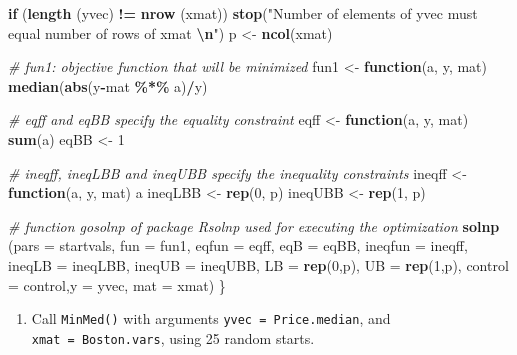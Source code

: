 \documentclass[
]{book}
\newenvironment{Shaded}{\begin{snugshade}}{\end{snugshade}}
\newcommand{\AttributeTok}[1]{\textcolor[rgb]{0.13,0.29,0.53}{#1}}
\newcommand{\CommentTok}[1]{\textcolor[rgb]{0.56,0.35,0.01}{\textit{#1}}}
\newcommand{\ControlFlowTok}[1]{\textcolor[rgb]{0.13,0.29,0.53}{\textbf{#1}}}
\newcommand{\DecValTok}[1]{\textcolor[rgb]{0.00,0.00,0.81}{#1}}
\newcommand{\FunctionTok}[1]{\textcolor[rgb]{0.13,0.29,0.53}{\textbf{#1}}}
\newcommand{\NormalTok}[1]{#1}
\newcommand{\OtherTok}[1]{\textcolor[rgb]{0.56,0.35,0.01}{#1}}
\newcommand{\SpecialCharTok}[1]{\textcolor[rgb]{0.81,0.36,0.00}{\textbf{#1}}}
\newcommand{\StringTok}[1]{\textcolor[rgb]{0.31,0.60,0.02}{#1}}
\providecommand{\tightlist}{%
  \setlength{\itemsep}{0pt}\setlength{\parskip}{0pt}}
\begin{document}
\begin{Shaded}
\begin{Highlighting}[]
  \ControlFlowTok{if}\NormalTok{ (}\FunctionTok{length}\NormalTok{ (yvec) }\SpecialCharTok{!=} \FunctionTok{nrow}\NormalTok{ (xmat)) }
    \FunctionTok{stop}\NormalTok{(}\StringTok{"Number of elements of yvec must equal number of rows of xmat }\SpecialCharTok{\textbackslash{}n}\StringTok{"}\NormalTok{)}
\NormalTok{  p }\OtherTok{\textless{}{-}} \FunctionTok{ncol}\NormalTok{(xmat)}
  
  \CommentTok{\# fun1: objective function that will be minimized}
\NormalTok{  fun1 }\OtherTok{\textless{}{-}} \ControlFlowTok{function}\NormalTok{(a, y, mat) }\FunctionTok{median}\NormalTok{(}\FunctionTok{abs}\NormalTok{(y}\SpecialCharTok{{-}}\NormalTok{mat }\SpecialCharTok{\%*\%}\NormalTok{ a)}\SpecialCharTok{/}\NormalTok{y) }

  \CommentTok{\# eqff and eqBB specify the equality constraint}
\NormalTok{  eqff }\OtherTok{\textless{}{-}} \ControlFlowTok{function}\NormalTok{(a, y, mat) }\FunctionTok{sum}\NormalTok{(a)}
\NormalTok{  eqBB }\OtherTok{\textless{}{-}} \DecValTok{1}
  
  \CommentTok{\# ineqff, ineqLBB and ineqUBB specify the inequality constraints}
\NormalTok{  ineqff }\OtherTok{\textless{}{-}} \ControlFlowTok{function}\NormalTok{(a, y, mat) a}
\NormalTok{  ineqLBB }\OtherTok{\textless{}{-}} \FunctionTok{rep}\NormalTok{(}\DecValTok{0}\NormalTok{, p)}
\NormalTok{  ineqUBB }\OtherTok{\textless{}{-}} \FunctionTok{rep}\NormalTok{(}\DecValTok{1}\NormalTok{, p)}

  \CommentTok{\# function gosolnp of package Rsolnp used for executing the optimization}
  \FunctionTok{solnp}\NormalTok{ (}\AttributeTok{pars =}\NormalTok{ startvals, }\AttributeTok{fun =}\NormalTok{ fun1, }\AttributeTok{eqfun =}\NormalTok{ eqff, }\AttributeTok{eqB  =}\NormalTok{ eqBB, }
         \AttributeTok{ineqfun =}\NormalTok{ ineqff, }\AttributeTok{ineqLB =}\NormalTok{ ineqLBB, }\AttributeTok{ineqUB =}\NormalTok{ ineqUBB, }\AttributeTok{LB =} \FunctionTok{rep}\NormalTok{(}\DecValTok{0}\NormalTok{,p), }
         \AttributeTok{UB =} \FunctionTok{rep}\NormalTok{(}\DecValTok{1}\NormalTok{,p), }\AttributeTok{control =}\NormalTok{ control,}\AttributeTok{y =}\NormalTok{ yvec, }\AttributeTok{mat =}\NormalTok{ xmat)  }
\NormalTok{  \}}
\end{Highlighting}
\end{Shaded}

\begin{enumerate}
\def\labelenumi{(\alph{enumi})}
\setcounter{enumi}{1}
\tightlist
\item
  Call \texttt{MinMed()} with arguments \texttt{yvec\ =\ Price.median}, and \texttt{xmat\ =\ Boston.vars}, using 25 random starts.
\end{enumerate}
\end{document}
